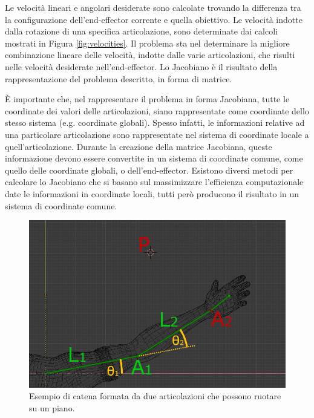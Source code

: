 Le velocità lineari e angolari desiderate sono calcolate trovando la differenza tra la configurazione dell'end-effector corrente e quella obiettivo. Le velocità indotte dalla rotazione di una specifica articolazione, sono determinate dai calcoli mostrati in Figura \ref{fig:velocities}.
Il problema sta nel determinare la migliore combinazione lineare delle velocità, indotte dalle varie articolazioni, che risulti nelle velocità desiderate nell'end-effector.
Lo Jacobiano è il risultato della rappresentazione del problema descritto, in forma di matrice.

È importante che, nel rappresentare il problema in forma Jacobiana, tutte le coordinate dei valori delle articolazioni, siano rappresentate come coordinate dello stesso sistema (e.g. coordinate globali).
Spesso infatti, le informazioni relative ad una particolare articolazione sono rappresentate nel sistema di coordinate locale a quell'articolazione.
Durante la creazione della matrice Jacobiana, queste informazione devono essere convertite in un sistema di coordinate comune, come quello delle coordinate globali, o dell'end-effector.
Esistono diversi metodi per calcolare lo Jacobiano che si basano sul massimizzare l'efficienza computazionale date le informazioni in coordinate locali, tutti però producono il risultato in un sistema di coordinate comune.

\begin{figure}
\centering
\includegraphics[width=.8\textwidth]{Figures/17}
\decoRule
\caption[IK: Esempio concreto]{Esempio di catena formata da due articolazioni che possono ruotare su un piano.}
\label{fig:IKex0}
\end{figure}


